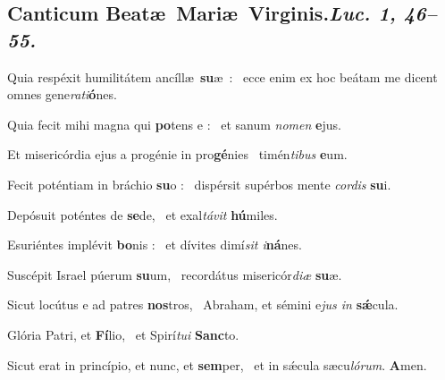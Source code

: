 \documentclass[12pt]{article} %
\newenvironment{psalmtext}{\leftskip 0.25in}{\vspace{2 mm}}
\let\oldgresixstar\gresixstar
\renewcommand{\gresixstar}{\textcolor{benred8}{\oldgresixstar}}
\def\capitulumSpace{\hspace{20 mm}}
\begin{document}
\subsection*{}

\subsection*{Canticum Beat\ae\ Mari\ae\ Virginis.\capitulumSpace \emph{Luc. 1, 46--55.}}


\gresetfirstlineaboveinitial{\small \textsc{ \textbf{\textcolor{benred8}{VIII G}}}}{\small \textsc{ \textbf{\textcolor{benred8}{VIII G}}}}

\begin{psalmtext}
Quia resp\'{e}xit humilit\'{a}tem anc\'{i}ll\ae\ \textbf{su}\ae\ : \gresixstar\ ecce enim ex hoc be\'{a}tam me dicent omnes gene\emph{rati}\textbf{\'{o}}nes.

Quia fecit mihi magna qui \textbf{po}tens e : \gresixstar\ et sanum \emph{nomen} \textbf{e}jus.

Et miseric\'{o}rdia ejus a prog\'{e}nie in pro\textbf{g\'{e}}nies \gresixstar\ tim\'{e}n\emph{tibus} \textbf{e}um.

Fecit pot\'{e}ntiam in br\'{a}chio \textbf{su}o : \gresixstar\ disp\'{e}rsit sup\'{e}rbos mente \emph{cordis} \textbf{su}i.

Dep\'{o}suit pot\'{e}ntes de \textbf{se}de, \gresixstar\ et exal\emph{t\'{a}vit} \textbf{h\'{u}}miles.

Esuri\'{e}ntes impl\'{e}vit \textbf{bo}nis : \gresixstar\ et d\'{i}vites dim\'{i}\emph{sit i}\textbf{n\'{a}}nes.

Susc\'{e}pit Israel p\'{u}erum \textbf{su}um, \gresixstar\ record\'{a}tus miseric\'{o}r\emph{di\ae} \textbf{su}\ae.

Sicut loc\'{u}tus e ad patres \textbf{nos}tros, \gresixstar\ Abraham, et s\'{e}mini e\emph{jus in} \textbf{s\'{\ae}}cula.

Glória Patri, et \textbf{Fí}lio, \gresixstar\ et Spirí\emph{tui} \textbf{Sanc}to.

Sicut erat in princípio, et nunc, et \textbf{sem}per, \gresixstar\ et in sǽcula sæcu\emph{lórum}. \textbf{A}men.

\end{psalmtext}
\end{document}
